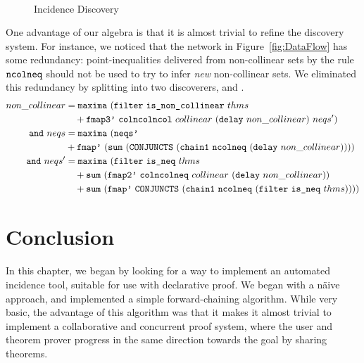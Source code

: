 \begin{figure}
\begin{align*}
\end{align*}
\caption{Incidence Discovery}
\label{fig:IncidenceDiscoveryCode}
\end{figure}

One advantage of our algebra is that it is almost trivial to refine the discovery system. For instance, we noticed that the network in Figure~\ref{fig:DataFlow} has some redundancy: point-inequalities delivered from non-collinear sets by the rule $\texttt{ncolneq}$ should not be used to try to infer \emph{new} non-collinear sets. We eliminated this redundancy by splitting  into two discoverers,  and . 
\begin{align*}
non\_collinear &= \code{maxima}\ (\code{filter}\ \code{is\_non\_collinear}\ thms\\
&\quad + \code{fmap3'}\ \code{colncolncol}\ collinear\ (\code{delay}\ non\_collinear)\ neqs')\\
\code{and}\ neqs &= \code{maxima}\ (\code{neqs'}\\
& + \code{fmap'}\ (\code{sum}\ (\code{CONJUNCTS}\ (\code{chain1}\ \code{ncolneq}\ (\code{delay}\ non\_collinear))))\\
\code{and}\ neqs' &= \code{maxima}\ (\code{filter}\ \code{is\_neq}\ thms\\
&\quad + \code{sum}\ (\code{fmap2'}\ \code{colncolneq}\ collinear\ (\code{delay}\ non\_collinear))\\
&\quad + \code{sum}\ (\code{fmap'}\ \code{CONJUNCTS}\ (\code{chain1}\ \code{ncolneq}\ (\code{filter}\ \code{is\_neq}\ thms))))
\end{align*}

\section{Conclusion}
In this chapter, we began by looking for a way to implement an automated incidence tool, suitable for use with declarative proof. We began with a n\"{a}ive approach, and implemented a simple forward-chaining algorithm. While very basic, the advantage of this algorithm was that it makes it almost trivial to implement a collaborative and concurrent proof system, where the user and theorem prover progress in the same direction towards the goal by sharing theorems.

